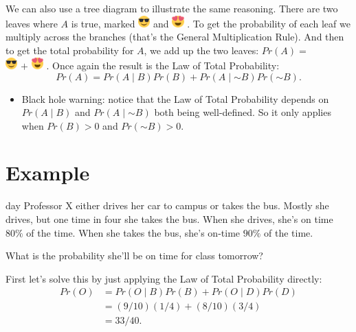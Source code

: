 \documentclass[justified]{tufte-book}
\newcommand{\given}{\mid}
\renewcommand{\neg}{\mathbin{\sim}}
\newcommand{\gt}{>}
\newcommand{\p}{Pr}
\newenvironment{warning}{\begin{itemize}\item[\faBan]}{\end{itemize}}
\theoremstyle{definition}
\theoremstyle{definition}
\theoremstyle{definition}
\theoremstyle{remark}
\begin{document}
We can also use a tree diagram to illustrate the same reasoning. There
are two leaves where \(A\) is true, marked
\includegraphics[width=0.18in]{img/emoji_shades_small} and
\includegraphics[width=0.18in]{img/emoji_hearts_small} . To get the
probability of each leaf we multiply across the branches (that's the
General Multiplication Rule). And then to get the total probability for
\(A\), we add up the two leaves: \(\p(A) =\)\\
\includegraphics[width=0.18in]{img/emoji_shades_small} \(+\)
\includegraphics[width=0.18in]{img/emoji_hearts_small} . Once again the
result is the Law of Total Probability: \[
  \p(A) = \p(A \given B) \p(B) + \p(A \given \neg B) \p(\neg B).
\]

\begin{warning}
Black hole warning: notice that the Law of Total Probability depends on
\(\p(A \given B)\) and \(\p(A \given \neg B)\) both being well-defined.
So it only applies when \(\p(B) \gt 0\) and \(\p(\neg B) \gt 0\).
\end{warning}

\hypertarget{example}{%
\section{Example}\label{example}}

 day Professor X either drives her car to campus or
takes the bus. Mostly she drives, but one time in four she takes the
bus. When she drives, she's on time \(80\%\) of the time. When she takes
the bus, she's on-time \(90\%\) of the time.

What is the probability she'll be on time for class tomorrow?

First let's solve this by just applying the Law of Total Probability
directly: \[
  \begin{aligned}
    \p(O) &= \p(O \given B)\p(B) + \p(O \given D)\p(D)\\
          &= (9/10)(1/4) + (8/10)(3/4)\\
          &= 33/40.
  \end{aligned}
\]
\end{document}
